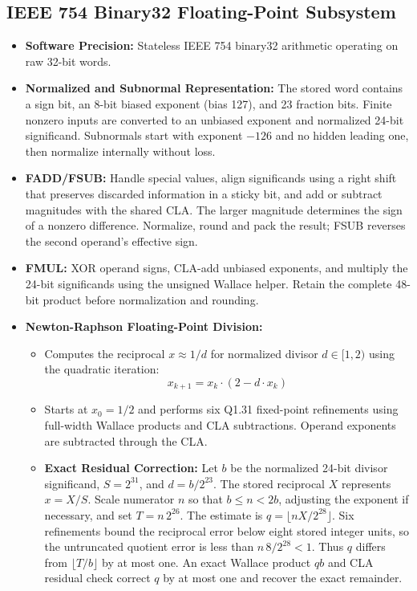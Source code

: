 \documentclass[11pt,a4paper]{article}
\begin{document}
\subsection{IEEE 754 Binary32 Floating-Point Subsystem}
\begin{itemize}
    \item \textbf{Software Precision:} Stateless IEEE 754 binary32 arithmetic operating on raw 32-bit words.
    \item \textbf{Normalized and Subnormal Representation:} The stored word contains a sign bit, an 8-bit biased exponent (bias 127), and 23 fraction bits. Finite nonzero inputs are converted to an unbiased exponent and normalized 24-bit significand. Subnormals start with exponent $-126$ and no hidden leading one, then normalize internally without loss.
    \item \textbf{FADD/FSUB:} Handle special values, align significands using a right shift that preserves discarded information in a sticky bit, and add or subtract magnitudes with the shared CLA. The larger magnitude determines the sign of a nonzero difference. Normalize, round and pack the result; FSUB reverses the second operand's effective sign.
    \item \textbf{FMUL:} XOR operand signs, CLA-add unbiased exponents, and multiply the 24-bit significands using the unsigned Wallace helper. Retain the complete 48-bit product before normalization and rounding.
    \item \textbf{Newton-Raphson Floating-Point Division:}
    \begin{itemize}
        \item Computes the reciprocal $x \approx 1/d$ for normalized divisor $d \in [1, 2)$ using the quadratic iteration:
        \begin{equation*}
            x_{k+1} = x_k \cdot (2 - d \cdot x_k)
        \end{equation*}
        \item Starts at $x_0=1/2$ and performs six Q1.31 fixed-point refinements using full-width Wallace products and CLA subtractions. Operand exponents are subtracted through the CLA.
        \item \textbf{Exact Residual Correction:} Let $b$ be the normalized 24-bit divisor significand, $S=2^{31}$, and $d=b/2^{23}$. The stored reciprocal $X$ represents $x=X/S$. Scale numerator $n$ so that $b\leq n<2b$, adjusting the exponent if necessary, and set $T=n\,2^{26}$. The estimate is $q=\lfloor nX/2^{28}\rfloor$. Six refinements bound the reciprocal error below eight stored integer units, so the untruncated quotient error is less than $n\,8/2^{28}<1$. Thus $q$ differs from $\lfloor T/b\rfloor$ by at most one. An exact Wallace product $qb$ and CLA residual check correct $q$ by at most one and recover the exact remainder.

\end{itemize}
\end{itemize}
\end{document}
